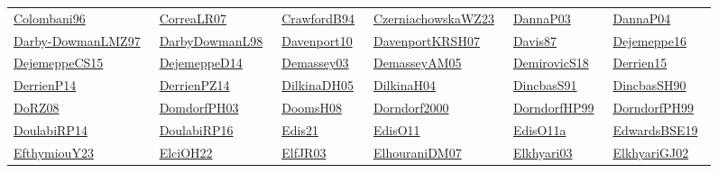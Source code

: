 \begin{longtable}{*{6}{l}}
\href{../works/Colombani96.pdf}{Colombani96}~\cite{Colombani96} & \href{../works/CorreaLR07.pdf}{CorreaLR07}~\cite{CorreaLR07} & \href{../works/CrawfordB94.pdf}{CrawfordB94}~\cite{CrawfordB94} & \href{../works/CzerniachowskaWZ23.pdf}{CzerniachowskaWZ23}~\cite{CzerniachowskaWZ23} & \href{../works/DannaP03.pdf}{DannaP03}~\cite{DannaP03} & \href{../}{DannaP04}~\cite{DannaP04}\\ 
\href{../works/Darby-DowmanLMZ97.pdf}{Darby-DowmanLMZ97}~\cite{Darby-DowmanLMZ97} & \href{../}{DarbyDowmanL98}~\cite{DarbyDowmanL98} & \href{../works/Davenport10.pdf}{Davenport10}~\cite{Davenport10} & \href{../works/DavenportKRSH07.pdf}{DavenportKRSH07}~\cite{DavenportKRSH07} & \href{../works/Davis87.pdf}{Davis87}~\cite{Davis87} & \href{../works/Dejemeppe16.pdf}{Dejemeppe16}~\cite{Dejemeppe16}\\ 
\href{../works/DejemeppeCS15.pdf}{DejemeppeCS15}~\cite{DejemeppeCS15} & \href{../works/DejemeppeD14.pdf}{DejemeppeD14}~\cite{DejemeppeD14} & \href{../works/Demassey03.pdf}{Demassey03}~\cite{Demassey03} & \href{../works/DemasseyAM05.pdf}{DemasseyAM05}~\cite{DemasseyAM05} & \href{../works/DemirovicS18.pdf}{DemirovicS18}~\cite{DemirovicS18} & \href{../works/Derrien15.pdf}{Derrien15}~\cite{Derrien15}\\ 
\href{../works/DerrienP14.pdf}{DerrienP14}~\cite{DerrienP14} & \href{../works/DerrienPZ14.pdf}{DerrienPZ14}~\cite{DerrienPZ14} & \href{../works/DilkinaDH05.pdf}{DilkinaDH05}~\cite{DilkinaDH05} & \href{../works/DilkinaH04.pdf}{DilkinaH04}~\cite{DilkinaH04} & \href{../works/DincbasS91.pdf}{DincbasS91}~\cite{DincbasS91} & \href{../works/DincbasSH90.pdf}{DincbasSH90}~\cite{DincbasSH90}\\ 
\href{../works/DoRZ08.pdf}{DoRZ08}~\cite{DoRZ08} & \href{../}{DomdorfPH03}~\cite{DomdorfPH03} & \href{../works/DoomsH08.pdf}{DoomsH08}~\cite{DoomsH08} & \href{../works/Dorndorf2000.pdf}{Dorndorf2000}~\cite{Dorndorf2000} & \href{../}{DorndorfHP99}~\cite{DorndorfHP99} & \href{../}{DorndorfPH99}~\cite{DorndorfPH99}\\ 
\href{../works/DoulabiRP14.pdf}{DoulabiRP14}~\cite{DoulabiRP14} & \href{../works/DoulabiRP16.pdf}{DoulabiRP16}~\cite{DoulabiRP16} & \href{../works/Edis21.pdf}{Edis21}~\cite{Edis21} & \href{../works/EdisO11.pdf}{EdisO11}~\cite{EdisO11} & \href{../}{EdisO11a}~\cite{EdisO11a} & \href{../}{EdwardsBSE19}~\cite{EdwardsBSE19}\\ 
\href{../works/EfthymiouY23.pdf}{EfthymiouY23}~\cite{EfthymiouY23} & \href{../works/ElciOH22.pdf}{ElciOH22}~\cite{ElciOH22} & \href{../}{ElfJR03}~\cite{ElfJR03} & \href{../works/ElhouraniDM07.pdf}{ElhouraniDM07}~\cite{ElhouraniDM07} & \href{../works/Elkhyari03.pdf}{Elkhyari03}~\cite{Elkhyari03} & \href{../works/ElkhyariGJ02.pdf}{ElkhyariGJ02}~\cite{ElkhyariGJ02}\\ 

\end{longtable}
